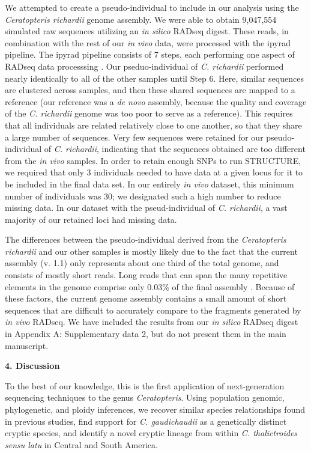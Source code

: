 \documentclass[12pt]{article}
\begin{document}
\begin{flushleft}
We attempted to create a pseudo-individual to include in our analysis using the \textit{Ceratopteris richardii} genome assembly. We were able to obtain 9,047,554 simulated raw sequences utilizing an \textit{in silico} RADseq digest. These reads, in combination with the rest of our \textit{in vivo} data, were processed with the ipyrad pipeline. The ipyrad pipeline consists of 7 steps, each performing one aspect of RADseq data processsing \autocite{Eaton2020}. Our pseduo-individual of \textit{C. richardii} performed nearly identically to all of the other samples until Step 6. Here, similar sequences are clustered across samples, and then these shared sequences are mapped to a reference (our reference was a \textit{de novo} assembly, because the quality and coverage of the \textit{C. richardii} genome was too poor to serve as a reference). This requires that all individuals are related relatively close to one another, so that they share a large number of sequences. Very few sequences were retained for our pseudo-individual of \textit{C. richardii}, indicating that the sequences obtained are too different from the \textit{in vivo} samples. In order to retain enough SNPs to run STRUCTURE, we required that only 3 individuals needed to have data at a given locus for it to be included in the final data set. In our entirely \textit{in vivo} dataset, this minimum number of individuals was 30; we designated such a high number to reduce missing data. In our dataset with the pseud-individual of \textit{C. richardii}, a vast majority of our retained loci had missing data.

The differences between the pseudo-individual derived from the \textit{Ceratopteris richardii} and our other samples is mostly likely due to the fact that the current assembly (v. 1.1) only represents about one third of the total genome, and consists of mostly short reads. Long reads that can span the many repetitive elements in the genome comprise only 0.03\% of the final assembly \autocite{Marchant2019}. Because of these factors, the current genome assembly contains a small amount of short sequences that are difficult to accurately compare to the fragments generated by \textit{in vivo} RADseq. We have included the results from our \textit{in silico} RADseq digest in Appendix A: Supplementary data 2, but do not present them in the main manuscript.

\vspace{1cm}

{\large\textbf{4. Discussion}}

To the best of our knowledge, this is the first application of next-generation sequencing techniques to the genus \textit{Ceratopteris}. Using population genomic, phylogenetic, and ploidy inferences, we recover similar species relationships found in previous studies, find support for \textit{C. gaudichaudii} as a genetically distinct cryptic species, and identify a novel cryptic lineage from within \textit{C. thalictroides} \textit{sensu latu} in Central and South America.


\end{flushleft}
\end{document}
